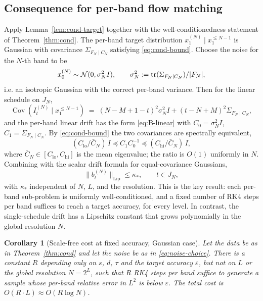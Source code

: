 \documentclass[11pt]{amsart}
\DeclareMathOperator{\tr}{tr}
\newtheorem{corollary}[theorem]{Corollary}
\theoremstyle{remark}
\numberwithin{equation}{section}
\begin{document}
\subsection{Consequence for per-band flow matching}
Apply Lemma~\ref{lem:cond-target} together with the well-conditionedness statement of Theorem~\ref{thm:cond}. The per-band target distribution $x_1^{(N)}\mid x_1^{\le N-1}$ is Gaussian with covariance $\Sigma_{F_N\mid C_N}$ satisfying \eqref{eq:cond-bound}. Choose the noise for the $N$-th band to be
\begin{equation}
\label{eq:noise-choice}
 x_0^{(N)}\sim\cN(0,\sigma_N^2 I),\qquad \sigma_N^2 := \tr(\Sigma_{F_N\mid C_N})/|F_N|,
\end{equation}
i.e. an isotropic Gaussian with the correct per-band variance. Then for the linear schedule on $J_N$,
\begin{equation}
 \operatorname{Cov}(I_t^{(N)}\mid x_1^{\le N-1}) \;=\; (N-M+1-t)^2 \sigma_N^2 I + (t-N+M)^2 \Sigma_{F_N\mid C_N},
\end{equation}
and the per-band linear drift has the form \eqref{eq:B-linear} with $C_0=\sigma_N^2 I$, $C_1=\Sigma_{F_N\mid C_N}$. By \eqref{eq:cond-bound} the two covariances are spectrally equivalent,
\begin{equation}
 (C_{\mathrm{lo}}/\bar C_N)\,I \preceq C_1 C_0^{-1} \preceq (C_{\mathrm{hi}}/\bar C_N)\, I,
\end{equation}
where $\bar C_N\in[C_{\mathrm{lo}},C_{\mathrm{hi}}]$ is the mean eigenvalue; the ratio is $O(1)$ uniformly in $N$. Combining with the scalar drift formula for equal-covariance Gaussians,
\begin{equation}
\label{eq:scale-free-lip}
 \|b_t^{(N)}\|_{\mathrm{Lip}} \le \kappa_*, \qquad t\in J_N,
\end{equation}
with $\kappa_*$ independent of $N$, $L$, and the resolution. This is the key result: each per-band sub-problem is uniformly well-conditioned, and a fixed number of RK4 steps per band suffices to reach a target accuracy, for every level. In contrast, the single-schedule drift has a Lipschitz constant that grows polynomially in the global resolution $N$.

\begin{corollary}[Scale-free cost at fixed accuracy, Gaussian case]
\label{cor:cost}
Let the data be as in Theorem~\ref{thm:cond} and let the noise be as in \eqref{eq:noise-choice}. There is a constant $R$ depending only on $s$, $d$, $\tau$ and the target accuracy $\varepsilon$, but not on $L$ or the global resolution $N=2^L$, such that $R$ RK4 steps per band suffice to generate a sample whose per-band relative error in $L^2$ is below $\varepsilon$. The total cost is $O(R\cdot L)\approx O(R\log N)$.
\end{corollary}
\end{document}
